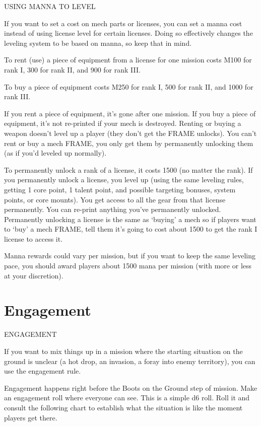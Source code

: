                                        USING MANNA TO LEVEL

If you want to set a cost on mech parts or licenses, you can set a manna cost instead of using
license level for certain licenses. Doing so effectively changes the leveling system to be based on
manna, so keep that in mind.


To rent (use) a piece of equipment from a license for one mission costs M100 for rank I, 300
for rank II, and 900 for rank III.

To buy a piece of equipment costs M250 for rank I, 500 for rank II, and 1000 for rank III.


If you rent a piece of equipment, it’s gone after one mission. If you buy a piece of equipment, it’s
not re-printed if your mech is destroyed. Renting or buying a weapon doesn’t level up a player
(they don’t get the FRAME unlocks). You can’t rent or buy a mech FRAME, you only get them by
permanently unlocking them (as if you’d leveled up normally).


To permanently unlock a rank of a license, it costs 1500 (no matter the rank). If you
permanently unlock a license, you level up (using the same leveling rules, getting 1 core point, 1
talent point, and possible targeting bonuses, system points, or core mounts). You get access to
all the gear from that license permanently. You can re-print anything you’ve permanently
unlocked. Permanently unlocking a license is the same as ‘buying’ a mech so if players want to
‘buy’ a mech FRAME, tell them it’s going to cost about 1500 to get the rank I license to access it.


Manna rewards could vary per mission, but if you want to keep the same leveling pace, you
should award players about 1500 mana per mission (with more or less at your discretion).

\chapter{Engagement}
                                         ENGAGEMENT


If you want to mix things up in a mission where the starting situation on the ground is unclear (a
hot drop, an invasion, a foray into enemy territory), you can use the engagement rule.





Engagement happens right before the Boots on the Ground step of mission. Make an
engagement roll where everyone can see. This is a simple d6 roll. Roll it and consult the
following chart to establish what the situation is like the moment players get there.


